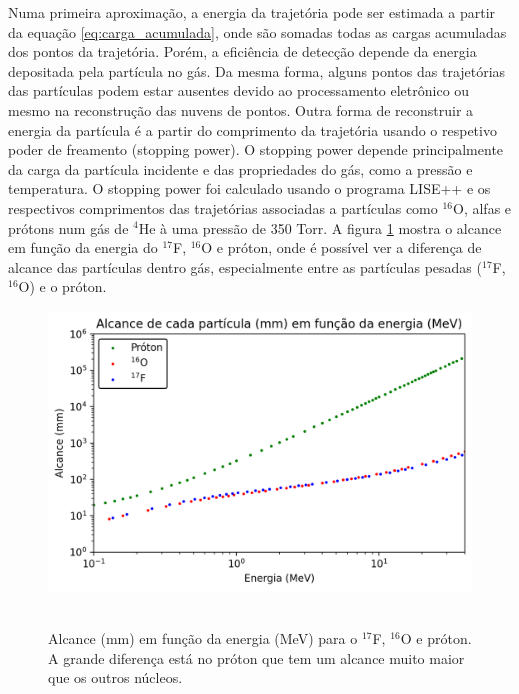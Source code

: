 \documentclass[a4paper,12pt,oneside]{book}
\begin{document}
\par Numa primeira aproximação, a energia da trajetória pode ser estimada a partir da equação \ref{eq:carga_acumulada}, onde são somadas todas as cargas acumuladas dos pontos da trajetória. Porém, a eficiência de detecção depende da energia depositada pela partícula no gás. Da mesma forma, alguns pontos das trajetórias das partículas podem estar ausentes devido ao processamento eletrônico ou mesmo na reconstrução das nuvens de pontos. Outra forma de reconstruir a energia da partícula é a partir do comprimento da trajetória usando o respetivo poder de freamento (stopping power). O stopping power depende principalmente da carga da partícula incidente e das propriedades do gás, como a pressão e temperatura. O stopping power foi calculado usando o programa LISE++\cite{lise++} e os respectivos comprimentos das trajetórias associadas a partículas como $^{16}$O, alfas e prótons num gás de $^4$He à uma pressão de 350 Torr. A figura \ref{fig:alcance_vs_energia} mostra o alcance em função da energia do $^{17}$F, $^{16}$O e próton, onde é possível ver a diferença de alcance das partículas dentro gás, especialmente entre as partículas pesadas ($^{17}$F, $^{16}$O) e o próton.


 \begin{figure}[H]
     \centering
     \includegraphics[scale = 0.85]{figs/alcance_vs_energia_2.png}\
     \caption{Alcance (mm) em função da energia (MeV) para o $^{17}$F, $^{16}$O e próton. A grande diferença está no próton que tem um alcance muito maior que os outros núcleos.}
     \label{fig:alcance_vs_energia}
 \end{figure}
\end{document}
